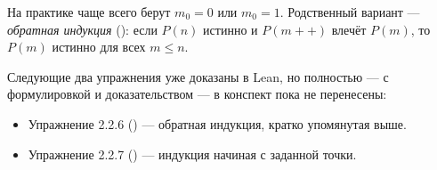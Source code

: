 \begin{remark}
На практике чаще всего берут $m_0=0$ или $m_0=1$. Родственный вариант — \emph{обратная
индукция} (): если $P(n)$ истинно и $P(m{+}{+})$ влечёт
$P(m)$, то $P(m)$ истинно для всех $m \leq n$.
\end{remark}

\begin{remark}
Следующие два упражнения уже доказаны в Lean, но полностью — с формулировкой и
доказательством — в конспект пока не перенесены:
\begin{itemize}
  \item Упражнение 2.2.6 () — обратная индукция, кратко
        упомянутая выше.
  \item Упражнение 2.2.7 () — индукция начиная с заданной точки.
\end{itemize}
\end{remark}
